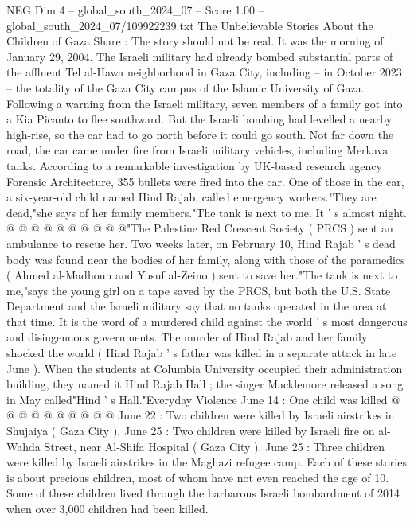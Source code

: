 \begin{textsample}{NEG Dim 4 – global\_south\_2024\_07 – Score 1.00 – global\_south\_2024\_07/109922239.txt}  \label{ex:f4_neg_346}
The Unbelievable Stories About the Children of Gaza Share : The story should not be real.
It was the morning of January 29, 2004.
The Israeli military had already bombed substantial parts of the affluent Tel al-Hawa neighborhood in Gaza City, including -- in October 2023 -- the totality of the Gaza City campus of the Islamic University of Gaza.
Following a warning from the Israeli military, seven members of a family got into a Kia Picanto to flee southward.
But the Israeli bombing had levelled a nearby high-rise, so the car had to go north before it could go south.
Not far down the road, the car came under fire from Israeli military vehicles, including Merkava tanks.
According to a remarkable investigation by UK-based research agency Forensic Architecture, 355 bullets were fired into the car.
One of those in the car, a six-year-old child named Hind Rajab, called emergency workers."They are dead,"she says of her family members."The tank is next to me.
It ' s almost night. @ @ @ @ @ @ @ @ @ @"The Palestine Red Crescent Society ( PRCS ) sent an ambulance to rescue her.
Two weeks later, on February 10, Hind Rajab ' s dead body was found near the bodies of her family, along with those of the paramedics ( Ahmed al-Madhoun and Yusuf al-Zeino ) sent to save her."The tank is next to me,"says the young girl on a tape saved by the PRCS, but both the U.S.
State Department and the Israeli military say that no tanks operated in the area at that time.
It is the word of a murdered child against the world ' s most dangerous and disingenuous governments.
The murder of Hind Rajab and her family shocked the world ( Hind Rajab ' s father was killed in a separate attack in late June ).
When the students at Columbia University occupied their administration building, they named it Hind Rajab Hall ; the singer Macklemore released a song in May called"Hind ' s Hall."Everyday Violence June 14 : One child was killed @ @ @ @ @ @ @ @ @ @ June 22 : Two children were killed by Israeli airstrikes in Shujaiya ( Gaza City ).
June 25 : Two children were killed by Israeli fire on al-Wahda Street, near Al-Shifa Hospital ( Gaza City ).
June 25 : Three children were killed by Israeli airstrikes in the Maghazi refugee camp.
Each of these stories is about precious children, most of whom have not even reached the age of 10.
Some of these children lived through the barbarous Israeli bombardment of 2014 when over 3,000 children had been killed.

\end{textsample}
